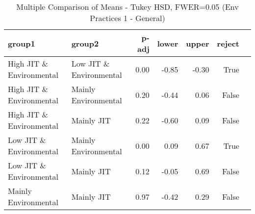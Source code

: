 \begin{table}[htbp]
\centering
\caption{Multiple Comparison of Means - Tukey HSD, FWER=0.05 (Env Practices 1 - General)}
\label{tab:your_label}
\begin{tabular}{llrrrrr}
\toprule
group1 & group2 & p-adj & lower & upper & reject \\
\midrule
High JIT \& Environmental & Low JIT \& Environmental & 0.00 & -0.85 & -0.30 & True \\
High JIT \& Environmental & Mainly Environmental & 0.20 & -0.44 & 0.06 & False \\
High JIT \& Environmental & Mainly JIT & 0.22 & -0.60 & 0.09 & False \\
Low JIT \& Environmental & Mainly Environmental & 0.00 & 0.09 & 0.67 & True \\
Low JIT \& Environmental & Mainly JIT & 0.12 & -0.05 & 0.69 & False \\
Mainly Environmental & Mainly JIT & 0.97 & -0.42 & 0.29 & False \\
\bottomrule
\end{tabular}\end{table}